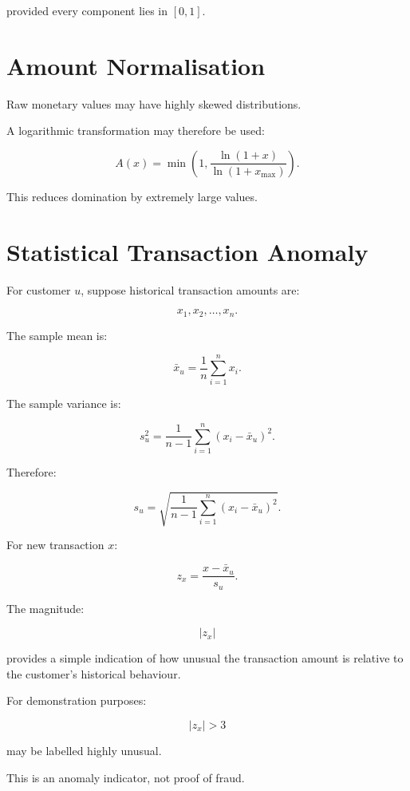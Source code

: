 \documentclass[11pt,a4paper]{article}
\begin{document}
provided every component lies in \([0,1]\).

\section{Amount Normalisation}

Raw monetary values may have highly skewed distributions.

A logarithmic transformation may therefore be used:

\[
A(x)
=
\min
\left(
1,
\frac{\ln(1+x)}
{\ln(1+x_{\max})}
\right).
\]

This reduces domination by extremely large values.

\section{Statistical Transaction Anomaly}

For customer \(u\), suppose historical transaction amounts are:

\[
x_1,x_2,\ldots,x_n.
\]

The sample mean is:

\[
\bar{x}_u
=
\frac{1}{n}
\sum_{i=1}^{n}x_i.
\]

The sample variance is:

\[
s_u^2
=
\frac{1}{n-1}
\sum_{i=1}^{n}
(x_i-\bar{x}_u)^2.
\]

Therefore:

\[
s_u
=
\sqrt{
\frac{1}{n-1}
\sum_{i=1}^{n}
(x_i-\bar{x}_u)^2
}.
\]

For new transaction \(x\):

\[
z_x
=
\frac{x-\bar{x}_u}{s_u}.
\]

The magnitude:

\[
|z_x|
\]

provides a simple indication of how unusual the transaction amount is
relative to the customer's historical behaviour.

For demonstration purposes:

\[
|z_x|>3
\]

may be labelled highly unusual.

This is an anomaly indicator, not proof of fraud.

\end{document}
